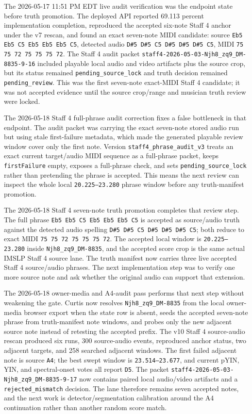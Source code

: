 The 2026-05-17 11:51 PM EDT live audit verification was the endpoint state before truth promotion. The deployed API reported 69.113 percent implementation completion, reproduced the accepted six-note Staff 4 anchor under the v7 rescan, and found an exact seven-note MIDI candidate: source \texttt{Eb5 Eb5 C5 Eb5 Eb5 Eb5 C5}, detected audio \texttt{D\#5 D\#5 C5 D\#5 D\#5 D\#5 C5}, MIDI \texttt{75 75 72 75 75 75 72}. The Staff 4 audit packet \texttt{staff4-2026-05-03-Njh8\_zq9\_DM-8835-9-16} included playable local audio and video artifacts plus the source crop, but its status remained \texttt{pending\_source\_lock} and truth decision remained \texttt{pending\_review}. This was the first seven-note exact-MIDI Staff 4 candidate; it was not accepted evidence until the source crop/range and musician truth review were locked.

The 2026-05-18 Staff 4 full-phrase audit correction fixes a false bottleneck in that endpoint. The audit packet was carrying the exact seven-note stored audio run but using stale first-failure metadata, which made the generated playable review window cover only the first note. Version \texttt{staff4\_phrase\_audit\_v3} treats an exact current target/audio MIDI sequence as a full-phrase packet, keeps \texttt{firstFailure} empty, exposes a full-phrase check, and sets \texttt{pending\_source\_lock} rather than pretending the phrase is accepted. This means the next review can inspect the whole local \texttt{20.225--23.280} phrase window before any truth-manifest promotion.

The 2026-05-18 Staff 4 seven-note truth promotion completes that review step. The full phrase \texttt{Eb5 Eb5 C5 Eb5 Eb5 Eb5 C5} is accepted as source/audio truth against the detected audio spelling \texttt{D\#5 D\#5 C5 D\#5 D\#5 D\#5 C5}; both reduce to exact MIDI \texttt{75 75 72 75 75 75 72}. The accepted local window is \texttt{20.225--23.280} inside \texttt{Njh8\_zq9\_DM-8835}, and the accepted score crop is the same actual IMSLP Staff 4 source lane. The truth manifest now carries three live accepted Staff 4 source/audio phrases. The next implementation step was to verify one more source note and ask whether the original audio can support that extension.

The 2026-05-18 owner-media and A4-audit pass performs that next step without weakening the gate. Curtis now resolves \texttt{Njh8\_zq9\_DM-8835} from the local owner-media browser export when the state row is absent, seeds the accepted seven-note phrase from truth-manifest note windows, and probes only the new adjacent source note instead of retesting the accepted prefix. The v10 Staff 4 source-audio rescan produced six runs, 300 source-audio events, reproduced anchor status, two adjacent targets, and 258 searched adjacent windows. The first failed adjacent note is source \texttt{A4}; the best swept window is \texttt{23.514--23.677}, and current pYIN, YIN, and spectral-onset votes all report \texttt{D5}. The packet \texttt{staff4-2026-05-03-Njh8\_zq9\_DM-8835-9-17} now contains paired local audio/video artifacts and a \texttt{rejected\_mismatch} decision. The lane therefore remains seven accepted notes, and the next work is detector/segmentation calibration around the A4 continuation rather than another random score match.

